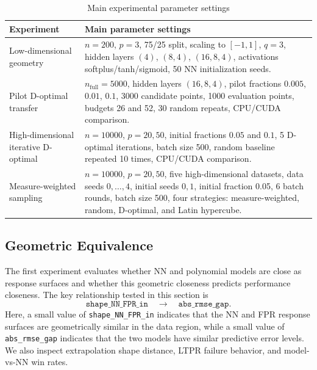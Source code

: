 \documentclass[]{interact}
\theoremstyle{plain}
\theoremstyle{definition}
\theoremstyle{remark}
\begin{document}
\begin{table}[htbp]
\centering
\caption{Main experimental parameter settings}
\label{tab:experiment-parameters}
\begin{tabular}{p{}p{}}
\toprule
\textbf{Experiment} & \textbf{Main parameter settings} \\
\midrule
Low-dimensional geometry
& $n=200$, $p=3$, 75/25 split, scaling to $[-1,1]$, $q=3$, hidden layers
$(4)$, $(8,4)$, $(16,8,4)$, activations softplus/tanh/sigmoid, 50 NN
initialization seeds. \\

Pilot D-optimal transfer
& $n_{\mathrm{full}}=5000$, hidden layers $(16,8,4)$, pilot fractions
$0.005$, $0.01$, $0.1$, 3000 candidate points, 1000 evaluation points,
budgets 26 and 52, 30 random repeats, CPU/CUDA comparison. \\

High-dimensional iterative D-optimal
& $n=10000$, $p=20,50$, initial fractions $0.05$ and $0.1$, 5 D-optimal
iterations, batch size 500, random baseline repeated 10 times, CPU/CUDA
comparison. \\

Measure-weighted sampling
& $n=10000$, $p=20,50$, five high-dimensional datasets, data seeds
$0,\ldots,4$, initial seeds $0,1$, initial fraction 0.05, 6 batch rounds,
batch size 500, four strategies: measure-weighted, random, D-optimal, and
Latin hypercube. \\
\bottomrule
\end{tabular}
\end{table}

\subsection{Geometric Equivalence}

The first experiment evaluates whether NN and polynomial models are close as
response surfaces and whether this geometric closeness predicts performance
closeness. The key relationship tested in this section is
\[
    \texttt{shape\_NN\_FPR\_in}
    \quad \longrightarrow \quad
    \texttt{abs\_rmse\_gap}.
\]
Here, a small value of \texttt{shape\_NN\_FPR\_in} indicates that the NN and
FPR response surfaces are geometrically similar in the data region, while a
small value of \texttt{abs\_rmse\_gap} indicates that the two models have
similar predictive error levels. We also inspect extrapolation shape distance,
LTPR failure behavior, and model-vs-NN win rates.
\end{document}
